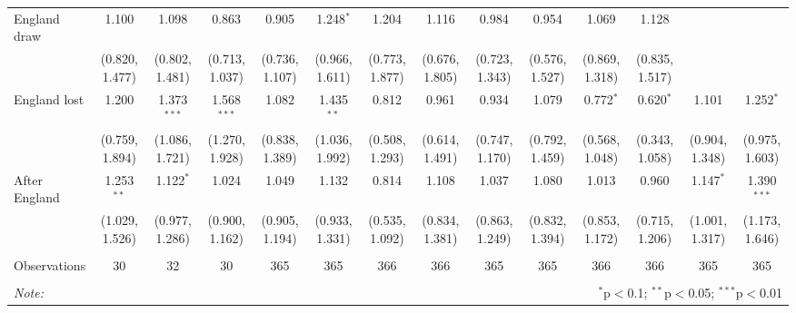\documentclass[12pt, a4paper]{article}
\begin{document}
\begin{table}
{\begin{threeparttable}
\begin{tabular}{@{\extracolsep{1pt}}lccccccccccccc}
 England draw & 1.100 & 1.098 & 0.863 & 0.905 & 1.248$^{*}$ & 1.204 & 1.116 & 0.984 & 0.954 & 1.069 & 1.128 &  &  \\ 
  & (0.820, 1.477) & (0.802, 1.481) & (0.713, 1.037) & (0.736, 1.107) & (0.966, 1.611) & (0.773, 1.877) & (0.676, 1.805) & (0.723, 1.343) & (0.576, 1.527) & (0.869, 1.318) & (0.835, 1.517) &  &  \\ 
 England lost & 1.200 & 1.373$^{***}$ & 1.568$^{***}$ & 1.082 & 1.435$^{**}$ & 0.812 & 0.961 & 0.934 & 1.079 & 0.772$^{*}$ & 0.620$^{*}$ & 1.101 & 1.252$^{*}$ \\ 
  & (0.759, 1.894) & (1.086, 1.721) & (1.270, 1.928) & (0.838, 1.389) & (1.036, 1.992) & (0.508, 1.293) & (0.614, 1.491) & (0.747, 1.170) & (0.792, 1.459) & (0.568, 1.048) & (0.343, 1.058) & (0.904, 1.348) & (0.975, 1.603) \\ 
 After England & 1.253$^{**}$ & 1.122$^{*}$ & 1.024 & 1.049 & 1.132 & 0.814 & 1.108 & 1.037 & 1.080 & 1.013 & 0.960 & 1.147$^{*}$ & 1.390$^{***}$ \\ 
  & (1.029, 1.526) & (0.977, 1.286) & (0.900, 1.162) & (0.905, 1.194) & (0.933, 1.331) & (0.535, 1.092) & (0.834, 1.381) & (0.863, 1.249) & (0.832, 1.394) & (0.853, 1.172) & (0.715, 1.206) & (1.001, 1.317) & (1.173, 1.646) \\ 
 \hline \\[-1.8ex] 
Observations & 30 & 32 & 30 & 365 & 365 & 366 & 366 & 365 & 365 & 366 & 366 & 365 & 365 \\ 
\hline 
\hline \\[-1.8ex] 
\textit{Note:}  & \multicolumn{13}{r}{$^{*}$p$<$0.1; $^{**}$p$<$0.05; $^{***}$p$<$0.01} \\ 
\end{tabular} 
\begin{tablenotes}

\end{tablenotes}
\end{threeparttable}}
\end{table}
\end{document}
